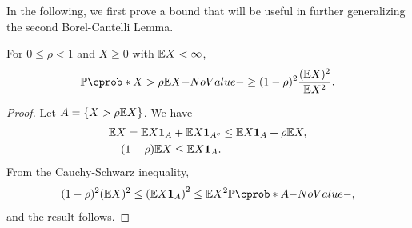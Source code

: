 \documentclass[12pt]{article}
\begin{document}
In the following, we first prove a bound that will be useful in further generalizing the second Borel-Cantelli Lemma. 

\begin{Lemma}\label{wk6:lem:2ndmoment}
For $0\leq\rho<1$ and $X \geq 0$ with $\E X < \infty$,
\begin{align*}
\P(X > \rho \E X) \geq (1-\rho)^2\frac{(\E X)^2}{\E X^2}.
\end{align*}
\end{Lemma}
\begin{proof}
Let $A = \{ X > \rho \E X\}$. We have
\begin{align*}
\E X = \E X\indicatore{A} + \E X\indicatore{A^c} &\leq \E X\indicatore{A} + \rho \E X,\\
(1-\rho)\E X \leq \E X\indicatore{A}.
\end{align*}
From the Cauchy-Schwarz inequality,
\begin{align*}
(1-\rho)^2(\E X)^2 \leq \left(\E X\indicatore{A}\right)^2 \leq \E X^2 \P(A),
\end{align*}
and the result follows.
\end{proof}
\end{document}
